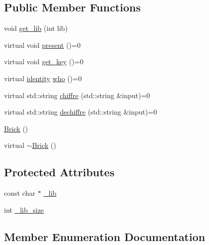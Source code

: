 \subsection*{Public Member Functions}
\begin{DoxyCompactItemize}
\item 
void \hyperlink{class_brick_a3e683a0fa3648b5a758b6f12d57365ab}{get\+\_\+lib} (int lib)
\item 
virtual void \hyperlink{class_brick_aa1e9b549787dedc030860f8c75482c8c}{present} ()=0
\item 
virtual void \hyperlink{class_brick_aeec3d78d8d03e207b4154ff06f637bbe}{get\+\_\+key} ()=0
\item 
virtual \hyperlink{class_brick_af32354a4d8d1275db35660a96a2cfa3e}{identity} \hyperlink{class_brick_af6ba737fda1fda2d3fba50de23cbaff0}{who} ()=0
\item 
virtual std\+::string \hyperlink{class_brick_a1cddb42fe77c9b6d140004d01ff7ab5b}{chiffre} (std\+::string \&input)=0
\item 
virtual std\+::string \hyperlink{class_brick_afa3a68ba4f4babecadc6dfd05a2d2040}{dechiffre} (std\+::string \&input)=0
\item 
\hyperlink{class_brick_aa29d678c3d901c7b18cbc3a27a51be17}{Brick} ()
\item 
virtual \hyperlink{class_brick_a0e27476ccaeaed1d61a06bddf247c8ee}{$\sim$\+Brick} ()
\end{DoxyCompactItemize}
\subsection*{Protected Attributes}
\begin{DoxyCompactItemize}
\item 
const char $\ast$ \hyperlink{class_brick_ae1175c82acc7e4e74a4cbe27ba75ae66}{\+\_\+lib}
\item 
int \hyperlink{class_brick_a990cb3ac8d11d28aa1fa68a4583ed704}{\+\_\+lib\+\_\+size}
\end{DoxyCompactItemize}


\subsection{Member Enumeration Documentation}
\hypertarget{class_brick_af32354a4d8d1275db35660a96a2cfa3e}{}

